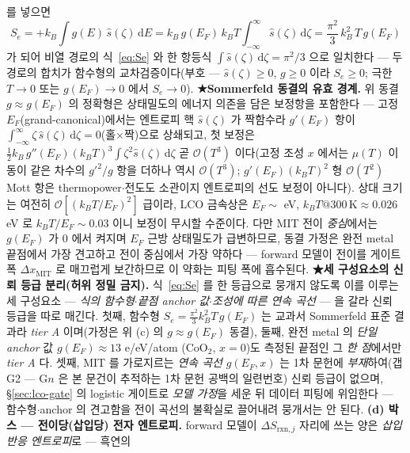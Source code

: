 \documentclass[11pt,a4paper]{article}
\newcommand{\dd}{\mathrm{d}}
\newcommand{\rxn}{\mathrm{rxn}}
\begin{document}
를 넣으면
\begin{equation}
S_e=+k_B\int g(E)\,\hat s(\zeta)\,\dd E
=k_B\,g(E_F)\,k_BT\!\int_{-\infty}^{\infty}\!\hat s(\zeta)\,\dd\zeta
=\frac{\pi^2}{3}\,k_B^2\,T\,g(E_F)
\label{eq:Sedirect}
\end{equation}
가 되어 비열 경로의 식~\eqref{eq:Se} 와 한 항등식 $\int \hat s(\zeta)\,\dd\zeta=\pi^2/3$ 으로 일치한다 — 두 경로의
합치가 함수형의 교차검증이다(부호 — $\hat s(\zeta)\ge0$, $g\ge0$ 이라 $S_e\ge0$; 극한 $T\to0$ 또는 $g(E_F)\to0$ 에서
$S_e\to0$).
\textbf{★Sommerfeld 동결의 유효 경계.} 위 동결 $g\approx g(E_F)$ 의 정확형은 상태밀도의 에너지 의존을 담은 보정항을
포함한다 --- 고정 $E_F$(grand-canonical)에서는 엔트로피 핵 $\hat s(\zeta)$ 가 짝함수라 $g'(E_F)$ 항이 $\int_{-\infty}^{\infty}\!\zeta\,\hat s(\zeta)\,\dd\zeta=0$(홀$\times$짝)으로
상쇄되고, 첫 보정은 $\tfrac12 k_B\,g''(E_F)(k_BT)^3\!\int\zeta^2 \hat s(\zeta)\,\dd\zeta$ 곧 $\mathcal O(T^3)$ 이다(고정 조성 $x$ 에서는
$\mu(T)$ 이동이 같은 차수의 $g'^2/g$ 항을 더하나 역시 $\mathcal O(T^3)$; $g'(E_F)(k_BT)^2$ 형 $\mathcal O(T^2)$ Mott 항은
thermopower$\cdot$전도도 소관이지 엔트로피의 선도 보정이 아니다). 상대 크기는 여전히 $\mathcal O[(k_BT/E_F)^2]$ 급이라,
LCO 금속상은 $E_F\sim$ eV, $k_BT@300\,\mathrm K\approx0.026$ eV 로 $k_BT/E_F\sim0.03$ 이니 보정이 무시할 수준이다. 다만 MIT 전이 \emph{중심}에서는 $g(E_F)$
가 0 에서 켜지며 $E_F$ 근방 상태밀도가 급변하므로, 동결 가정은 완전 metal 끝점에서 가장 견고하고 전이 중심에서
가장 약하다 — forward 모델이 전이를 게이트 폭 $\Delta x_\mathrm{MIT}$ 로 매끄럽게 보간하므로 이 약화는 피팅 폭에
흡수된다. \textbf{★세 구성요소의 신뢰 등급 분리(허위 정밀 금지).}
식~\eqref{eq:Se} 를 한 등급으로 뭉개지 않도록 이를 이루는 세 구성요소 — \emph{식의 함수형}$\cdot$\emph{끝점
anchor 값}$\cdot$\emph{조성에 따른 연속 곡선} — 을 갈라 신뢰 등급을 따로 매긴다. 첫째, 함수형
$S_e=\tfrac{\pi^2}{3}k_B^2T\,g(E_F)$ 는 교과서 Sommerfeld 표준 결과라 \emph{tier A} 이며(가정은 위 (c) 의
$g\!\approx\!g(E_F)$ 동결), 둘째, 완전 metal 의 \emph{단일 anchor} 값 $g(E_F)\!\approx\!13$ e/eV/atom
($\mathrm{CoO_2}$, $x{=}0$)도 측정된 끝점인 그 \emph{한 점}에서만 \emph{tier A} 다\cite{motohashi2009}. 셋째,
MIT 를 가로지르는 \emph{연속 곡선} $g(E_F,x)$ 는 1차 문헌에 \emph{부재}하여(갭 G2 — G$n$ 은 본 문건이
추적하는 1차 문헌 공백의 일련번호) 신뢰 등급이 없으며,
\S\ref{sec:lco-gate} 의 logistic 게이트로 \emph{모델 가정}을 세운 뒤 데이터 피팅에 위임한다 — 함수형$\cdot$anchor
의 견고함을 전이 곡선의 불확실로 끌어내려 뭉개서는 안 된다. \textbf{(d) 박스 — 전이당(삽입당) 전자 엔트로피.} forward 모델이 $\Delta S_{\rxn,j}$ 자리에 쓰는 양은 \emph{삽입 반응 엔트로피}로 — 흑연의
\end{document}
